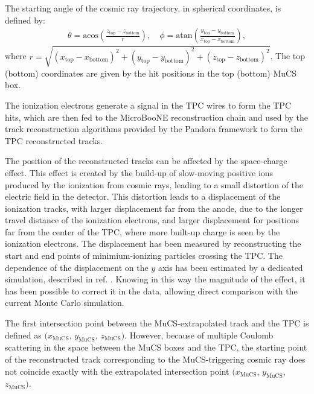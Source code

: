 \documentclass[a4paper,11pt]{article}
\begin{document}
The starting angle of the cosmic ray trajectory, in spherical coordinates, is defined by:
\begin{align}\label{eq:angles_mucs}
  \theta = \mathrm{acos}\left(\frac{z_{\mathrm{top}}-z_{\mathrm{bottom}}}{r}\right), \quad
  \phi = \mathrm{atan}\left(\frac{y_{\mathrm{top}}-y_{\mathrm{bottom}}}{x_{\mathrm{top}}-x_{\mathrm{bottom}}}\right),
\end{align}
where $r = \sqrt{(x_{\mathrm{top}}-x_{\mathrm{bottom}})^2+(y_{\mathrm{top}}-y_{\mathrm{bottom}})^2+(z_{\mathrm{top}}-z_{\mathrm{bottom}})^2}$. The top (bottom) coordinates are given by the hit positions in the top (bottom) MuCS box.

The ionization electrons generate a signal in the TPC wires to form the TPC hits, which are then fed to the MicroBooNE reconstruction chain and used by the track reconstruction algorithms provided by the Pandora framework \cite{pandora} to form the TPC reconstructed tracks.

The position of the reconstructed tracks can be affected by the space-charge effect. This effect is created by the build-up of slow-moving positive ions produced by the ionization from cosmic rays, leading to a small distortion of the electric field in the detector. This distortion leads to a displacement of the ionization tracks, with larger displacement far from the anode, due to the longer travel distance of the ionization electrons, and larger displacement for positions far from the center of the TPC, where more built-up charge is seen by the ionization electrons. The displacement has been measured by reconstructing the start and end points of minimium-ionizing particles crossing the TPC. The dependence of the displacement on the $y$ axis has been estimated by a dedicated simulation, described in ref. \cite{spacecharge}. Knowing in this way the magnitude of the effect, it has been possible to correct it in the data, allowing direct comparison with the current Monte Carlo simulation.

The first intersection point between the MuCS-extrapolated track and the TPC is defined as $(x_{\mathrm{MuCS}}$, $y_{\mathrm{MuCS}}$, $z_{\mathrm{MuCS}})$. However, because of multiple Coulomb scattering in the space between the MuCS boxes and the TPC, the starting point of the reconstructed track corresponding to the MuCS-triggering cosmic ray does not coincide exactly with the extrapolated intersection point $(x_{\mathrm{MuCS}}$, $y_{\mathrm{MuCS}}$, $z_{\mathrm{MuCS}})$.
\end{document}
